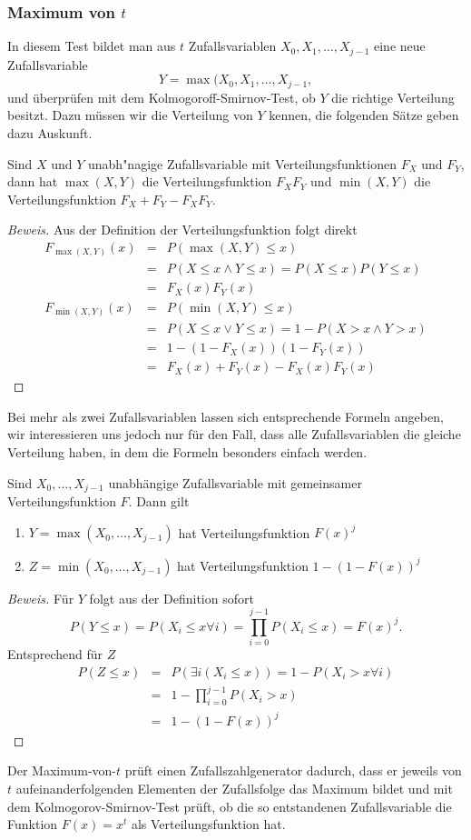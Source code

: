 \subsubsection{Maximum von \texorpdfstring{$t$}{t}}
In diesem Test bildet man aus $t$ Zufallsvariablen
$X_0,X_1,\dots,X_{j-1}$ eine neue Zufallsvariable
\begin{equation}
Y=\max(X_0,X_1,\dots,X_{j-1},
\end{equation}
und überprüfen mit dem Kolmogoroff-Smirnov-Test, ob $Y$ die richtige
Verteilung besitzt.
Dazu müssen wir die Verteilung von $Y$ kennen,
die folgenden Sätze geben dazu Auskunft.
\begin{satz}Sind $X$ und $Y$ unabh"nagige Zufallsvariable mit
Verteilungsfunktionen $F_X$ und $F_Y$, dann hat $\max(X,Y)$
die Verteilungsfunktion $F_XF_Y$ und $\min(X,Y)$ die Verteilungsfunktion
$F_X+F_Y-F_XF_Y$.
\end{satz}
\begin{proof}[Beweis]
Aus der Definition der Verteilungsfunktion folgt direkt
\begin{eqnarray}
F_{\max(X,Y)}(x)&=&P(\max(X,Y)\le x)\nonumber\\
&=&P(X\le x\wedge Y\le x)=P(X\le x)P(Y\le x)\nonumber\\
&=&F_X(x)F_Y(x)\\
F_{\min(X,Y)}(x)&=&P(\min(X,Y)\le x)\nonumber\\
&=&P(X\le x\vee Y\le x)=1-P(X>x\wedge Y>x)\nonumber\\
&=&1-(1-F_X(x))(1-F_Y(x))\nonumber\\
&=&F_X(x)+F_Y(x)-F_X(x)F_Y(x)
\end{eqnarray}
\end{proof}
Bei mehr als zwei Zufallsvariablen lassen sich entsprechende
Formeln angeben, wir interessieren uns jedoch nur für den Fall,
dass alle Zufallsvariablen die gleiche Verteilung haben, in dem
die Formeln besonders einfach werden.
\begin{satz}Sind $X_0,\dots,X_{j-1}$ unabhängige Zufallsvariable mit
gemeinsamer Verteilungsfunktion $F$.
Dann gilt
\begin{enumerate}
\item $Y=\max(X_0,\dots,X_{j-1})$ hat Verteilungsfunktion $F(x)^j$
\item $Z=\min(X_0,\dots,X_{j-1})$ hat Verteilungsfunktion $1-(1-F(x))^j$
\end{enumerate}
\end{satz}

\begin{proof}[Beweis]
Für $Y$ folgt aus der Definition sofort
\begin{equation}
P(Y\le x)=P(X_i\le x\forall i)=\prod_{i=0}^{j-1}P(X_i\le x)=F(x)^j.
\end{equation}
Entsprechend für $Z$
\begin{eqnarray}
P(Z\le x)&=&P(\exists i (X_i\le x)) = 1-P(X_i>x\forall i)\nonumber\\
&=&1-\prod_{i=0}^{j-1} P(X_i>x)\nonumber\\
&=&1-(1-F(x))^j
\end{eqnarray}
\end{proof}

Der Maximum-von-$t$ prüft einen Zufallszahlgenerator dadurch, dass
er jeweils von $t$ aufeinanderfolgenden Elementen der Zufallsfolge
das Maximum bildet und mit dem Kolmogorov-Smirnov-Test prüft,
ob die so entstandenen Zufallsvariable die Funktion $F(x)=x^t$ als
Verteilungsfunktion hat.
